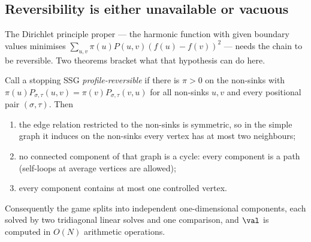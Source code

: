 \subsection{Reversibility is either unavailable or vacuous}\label{vr:sec-rev}

The Dirichlet principle proper --- the harmonic function with given boundary
values minimises $\sum_{u,v}\pi(u)P(u,v)(f(u)-f(v))^{2}$ --- needs the chain
to be reversible. Two theorems bracket what that hypothesis can do here.

\begin{theorem}\label{vr:rev-trivial}
Call a stopping SSG \emph{profile-reversible} if there is $\pi>0$ on the
non-sinks with $\pi(u)P_{\sigma,\tau}(u,v)=\pi(v)P_{\sigma,\tau}(v,u)$ for
all non-sinks $u,v$ and every positional pair $(\sigma,\tau)$. Then
\begin{enumerate}[label=(\alph*),leftmargin=2.2em]
\item the edge relation restricted to the non-sinks is symmetric, so in the
      simple graph it induces on the non-sinks every vertex has at most two
      neighbours;
\item no connected component of that graph is a cycle: every component is a
      path (self-loops at average vertices are allowed);
\item every component contains at most one controlled vertex.
\end{enumerate}
Consequently the game splits into independent one-dimensional components,
each solved by two tridiagonal linear solves and one comparison, and
$\val$ is computed in $O(N)$ arithmetic operations.
\end{theorem}

